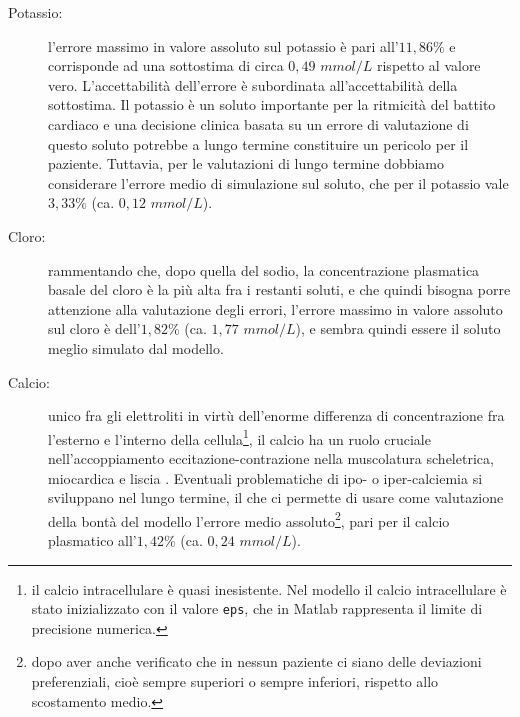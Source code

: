 \begin{description}
	\item[Potassio:] l'errore massimo in valore assoluto sul potassio è pari all'$11,86\%$ e corrisponde ad una sottostima di circa $0,49$ $mmol/L$ rispetto al valore vero. L'accettabilità dell'errore è subordinata all'accettabilità della sottostima. Il potassio è un soluto importante per la ritmicità del battito cardiaco e una decisione clinica basata su un errore di valutazione di questo soluto potrebbe a lungo termine constituire un pericolo per il paziente. Tuttavia, per le valutazioni di lungo termine dobbiamo considerare l'errore medio di simulazione sul soluto, che per il potassio vale $3,33\%$ (ca. $0,12$ $mmol/L$).
	\item[Cloro:] rammentando che, dopo quella del sodio, la concentrazione plasmatica basale del cloro è la più alta fra i restanti soluti, e che quindi bisogna porre attenzione alla valutazione degli errori, l'errore massimo in valore assoluto sul cloro è dell'$1,82\%$ (ca. $1,77$ $mmol/L$), e sembra quindi essere il soluto meglio simulato dal modello. 
	\item[Calcio:] unico fra gli elettroliti in virtù dell'enorme differenza di concentrazione fra l'esterno e l'interno della cellula\footnote{il calcio intracellulare è quasi inesistente. Nel modello il calcio intracellulare è stato inizializzato con il valore \texttt{eps}, che in Matlab rappresenta il limite di precisione numerica.}, il calcio ha un ruolo cruciale nell'accoppiamento eccitazione-contrazione nella muscolatura scheletrica, miocardica e liscia \cite{guyton}. Eventuali problematiche di ipo- o iper-calciemia si sviluppano nel lungo termine, il che ci permette di usare come valutazione della bontà del modello l'errore medio assoluto\footnote{dopo aver anche verificato che in nessun paziente ci siano delle deviazioni preferenziali, cioè sempre superiori o sempre inferiori, rispetto allo scostamento medio.}, pari per il calcio plasmatico all'$1,42\%$ (ca. $0,24$ $mmol/L$).

\end{description}
